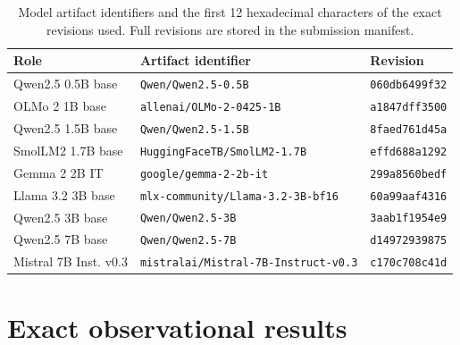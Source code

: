 \documentclass{article}
\begin{document}
\begin{table}[H]
\centering
\scriptsize
\setlength{\tabcolsep}{3.5pt}
\begin{tabular}{lll}
\toprule
Role & Artifact identifier & Revision \\
\midrule
Qwen2.5 0.5B base & \texttt{Qwen/Qwen2.5-0.5B} & \texttt{060db6499f32} \\
OLMo 2 1B base & \texttt{allenai/OLMo-2-0425-1B} & \texttt{a1847dff3500} \\
Qwen2.5 1.5B base & \texttt{Qwen/Qwen2.5-1.5B} & \texttt{8faed761d45a} \\
SmolLM2 1.7B base & \texttt{HuggingFaceTB/SmolLM2-1.7B} & \texttt{effd688a1292} \\
Gemma 2 2B IT & \texttt{google/gemma-2-2b-it} & \texttt{299a8560bedf} \\
Llama 3.2 3B base & \texttt{mlx-community/Llama-3.2-3B-bf16} & \texttt{60a99aaf4316} \\
Qwen2.5 3B base & \texttt{Qwen/Qwen2.5-3B} & \texttt{3aab1f1954e9} \\
Qwen2.5 7B base & \texttt{Qwen/Qwen2.5-7B} & \texttt{d14972939875} \\
Mistral 7B Inst. v0.3 & \texttt{mistralai/Mistral-7B-Instruct-v0.3} & \texttt{c170c708c41d} \\
\bottomrule
\end{tabular}
\caption{Model artifact identifiers and the first 12 hexadecimal characters
of the exact revisions used. Full revisions are stored in the
submission manifest.}
\label{tab:models}
\end{table}

\section{Exact observational results}
\label{app:observational}
\end{document}
